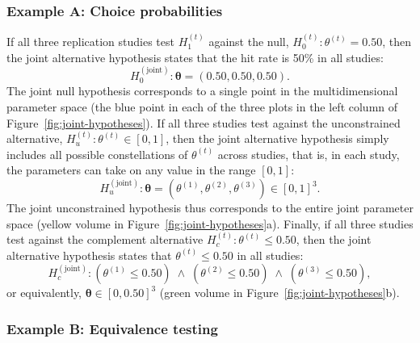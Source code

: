 \documentclass[letterpaper,11pt,oneside]{article}
\begin{document}
\subsubsection{Example A: Choice probabilities}

If all three replication studies test $H^{(t)}_1$ against the null, $H^{(t)}_0: \theta^{(t)} = 0.50$, then the joint alternative hypothesis states that the hit rate is 50\% in all studies:
    \[
    H_{0}^{(\text{joint})}: \boldsymbol{\theta} = (0.50, 0.50, 0.50).
    \]
The joint null hypothesis corresponds to a single point in the multidimensional parameter space (the blue point in each of the three plots in the left column of Figure~\ref{fig:joint-hypotheses}). If all three studies test against the unconstrained alternative, $H_{u}^{(t)}: \theta^{(t)} \in [0,1]$, then the joint alternative hypothesis simply includes all possible constellations of $\theta^{(t)}$ across studies, that is, in each study, the parameters can take on any value in the range $[0,1]$:
    \[
    H_{u}^{(\text{joint})}: \boldsymbol{\theta} = \left(\theta^{(1)}, \theta^{(2)}, \theta^{(3)}\right) \in [0,1]^3.
    \]
The joint unconstrained hypothesis thus corresponds to the entire joint parameter space (yellow volume in Figure~\ref{fig:joint-hypotheses}a). Finally, if all three studies test against the complement alternative $H^{(t)}_c: \theta^{(t)} \leq 0.50$, then the joint alternative hypothesis states that $\theta^{(t)} \leq 0.50$ in all studies:
    \[
    H_{c}^{(\text{joint})}: \left(\theta^{(1)} \leq 0.50\right) \;\land\; \left(\theta^{(2)} \leq 0.50\right) \;\land\; \left(\theta^{(3)} \leq 0.50\right),
    \]
or equivalently, $\boldsymbol{\theta} \in [0, 0.50]^3$ (green volume in Figure~\ref{fig:joint-hypotheses}b).

\subsubsection{Example B: Equivalence testing}
\end{document}
